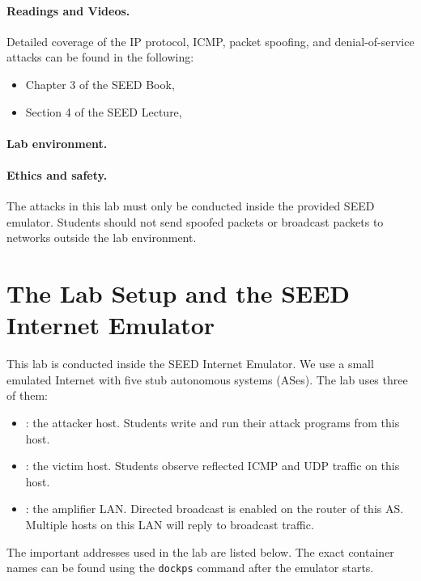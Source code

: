 \paragraph{Readings and Videos.}
Detailed coverage of the IP protocol, ICMP, packet spoofing, and denial-of-service
attacks can be found in the following:

\begin{itemize}
\item Chapter 3 of the SEED Book, \seedisbook
\item Section 4 of the SEED Lecture, \seedisvideo
\end{itemize}


\paragraph{Lab environment.}
\seedenvironmentB
\nodependency


\paragraph{Ethics and safety.}
The attacks in this lab must only be conducted inside the provided SEED
emulator. Students should not send spoofed packets or broadcast packets to
networks outside the lab environment.


\section{The Lab Setup and the SEED Internet Emulator}

This lab is conducted inside the SEED Internet Emulator. We use a small
emulated Internet with five stub autonomous systems (ASes). The lab uses three
of them:

\begin{itemize}[noitemsep]
\item \attacker: the attacker host. Students write and run their attack programs
      from this host.
\item \victim: the victim host. Students observe reflected ICMP and UDP traffic
      on this host.
\item \amplifier: the amplifier LAN. Directed broadcast is enabled on the router
      of this AS. Multiple hosts on this LAN will reply to broadcast traffic.
\end{itemize}

The important addresses used in the lab are listed below. The exact container
names can be found using the \texttt{dockps} command after the emulator starts.

